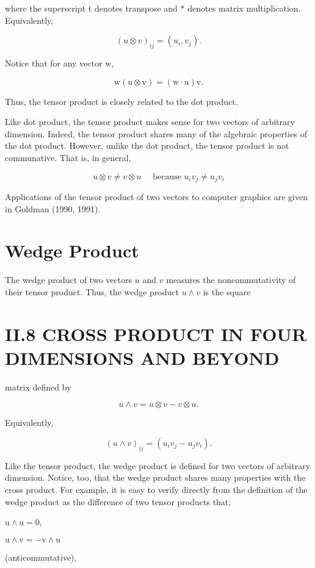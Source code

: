 \begin{CJK}{UTF8}{gbsn}
where the superscript $\mathrm{t}$ denotes transpose and $*$ denotes matrix multiplication. Equivalently,

$$
(u \otimes v)_{i j}=\left(u_{i}, v_{j}\right) .
$$

Notice that for any vector $\mathrm{w}$,

$$
\mathrm{w}(\mathrm{u} \otimes \mathrm{v})=(\mathrm{w} \cdot \mathrm{u}) \mathrm{v} .
$$

Thus, the tensor product is closely related to the dot product.

Like dot product, the tensor product makes sense for two vectors of arbitrary dimension. Indeed, the tensor product shares many of the algebraic properties of the dot product. However, unlike the dot product, the tensor product is not communative. That is, in general,

$$
u \otimes v \neq v \otimes u \quad \text { because } u_{i} v_{j} \neq u_{j} v_{i}
$$

Applications of the tensor product of two vectors to computer graphics are given in Goldman (1990, 1991).

\section{Wedge Product}
The wedge product of two vectors $u$ and $v$ measures the noncommutativity of their tensor product. Thus, the wedge product $u \wedge v$ is the square

\section{II.8 CROSS PRODUCT IN FOUR DIMENSIONS AND BEYOND}
matrix defined by

$$
u \wedge v=u \otimes v-v \otimes u .
$$

Equivalently,

$$
(u \wedge v)_{i j}=\left(u_{i} v_{j}-u_{j} v_{i}\right) .
$$

Like the tensor product, the wedge product is defined for two vectors of arbitrary dimension. Notice, too, that the wedge product shares many properties with the cross product. For example, it is easy to verify directly from the definition of the wedge product as the difference of two tensor products that:

$\mathrm{u} \wedge \mathrm{u}=0$,

$\mathrm{u} \wedge \mathrm{v}=-\mathrm{v} \wedge \mathrm{u}$

(anticommutative),


\end{CJK}
